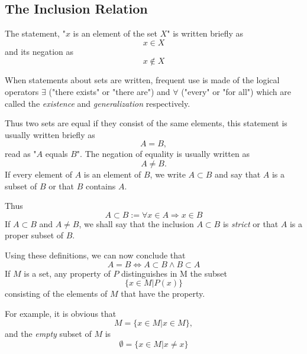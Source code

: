 \documentclass[a4paper,12pt]{article} %
\begin{document}
\subsection{The Inclusion Relation}
The statement, "$x$ is an element of the set $X$" is written 
briefly as
\[ 
    x\in X
\]
and its negation as
\[
    x \notin X
\]

When statements about sets are written, frequent use is 
made of the logical operators $\exists$ ("there exists" or "there
are") and $\forall$ ("every" or "for all") which are called the
\emph{existence} and \emph{generalization} respectively.

Thus two sets are equal if they consist of the same 
elements, this statement is usually written briefly as 
\[
    A=B,
\]
read as "$A$ equals $B$". The negation of equality is usually 
written as 
\[
    A \ne B.
\]
If every element of $A$ is an element of $B$, we write
$A\subset B$ and say that $A$ is a subset of 
$B$ or that $B$ contains $A$.

Thus 
\[
    A\subset B := \forall x\in A \Rightarrow x\in B
\]
If $A\subset B$ and $A\ne B$, we shall say that the inclusion $A\subset B$ is 
\emph{strict} or that $A$ is a proper subset of $B$.

Using these definitions, we can now conclude that
\[A=B \Leftrightarrow A\subset B \wedge B\subset A\]
If $M$ is a set, any property of $P$ distinguishes in M the subset
\[\{x\in M \vert P(x)\}\]
consisting of the elements of $M$ that have the property.

For example, it is obvious that 
\[ M=\{x\in M \vert x\in M\},\]
and the \emph{empty} subset of $M$ is 
\[\emptyset = \{x\in M \vert x\ne x\}\]
\end{document}
